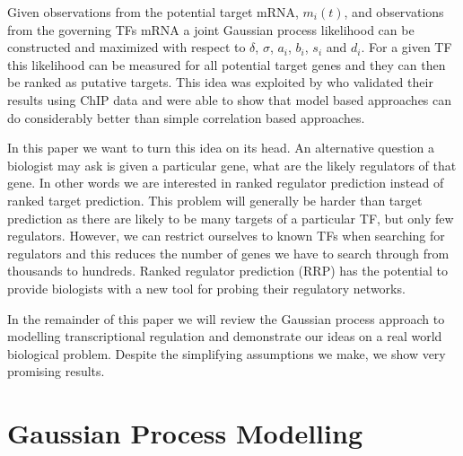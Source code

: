 \documentclass{article}
\begin{document}
Given  observations  from the  potential  target  mRNA, $m_i(t)$,  and
observations  from the  governing TFs  mRNA a  joint  Gaussian process
likelihood can be constructed  and maximized with respect to $\delta$,
$\sigma$,  $a_i$,  $b_i$,  $s_i$  and  $d_i$.  For  a  given  TF  this
likelihood can be measured for all potential target genes and they can
then  be  ranked as  putative  targets.  This  idea was  exploited  by
\cite{Honkela:modelbased10} who  validated their results using ChIP
data and were
able to  show that model  based approaches can do  considerably better
than simple correlation based approaches.

In this  paper we want to turn  this idea on its  head. An alternative
question a biologist may ask is  given a particular gene, what are the
likely regulators  of that gene. In  other words we  are interested in
ranked regulator prediction instead  of ranked target prediction. This
problem will generally  be harder than target prediction  as there are
likely  to  be  many  targets   of  a  particular  TF,  but  only  few
regulators.  However, we  can  restrict ourselves  to  known TFs  when
searching for regulators and this  reduces the number of genes we have
to  search  through  from  thousands  to  hundreds.  Ranked  regulator
prediction (RRP)  has the potential  to provide biologists with  a new
tool for probing their regulatory networks.

In the remainder of this paper we will review the Gaussian process
approach to modelling transcriptional regulation and demonstrate our
ideas on a real world biological problem. Despite the simplifying
assumptions we make, we show very promising results.

\section{Gaussian Process Modelling}
\end{document}
